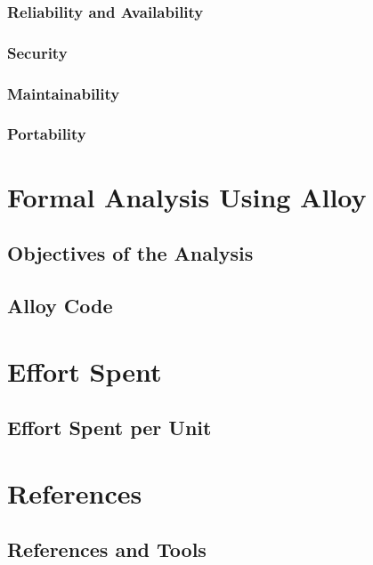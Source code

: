 \documentclass{article}
\begin{document}
\subsubsection{Reliability and Availability}
\subsubsection{Security}
\subsubsection{Maintainability}
\subsubsection{Portability}

\section{Formal Analysis Using Alloy}
\subsection{Objectives of the Analysis}
\subsection{Alloy Code}

\section{Effort Spent}
\subsection{Effort Spent per Unit}

\section{References}
\subsection{References and Tools}

\maketitle
\end{document}
